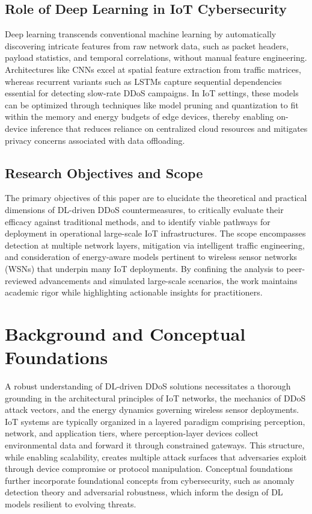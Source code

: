 \documentclass[12pt]{article}
\begin{document}
\subsection{Role of Deep Learning in IoT Cybersecurity}

Deep learning transcends conventional machine learning by automatically discovering intricate features from raw network data, such as packet headers, payload statistics, and temporal correlations, without manual feature engineering. Architectures like CNNs excel at spatial feature extraction from traffic matrices, whereas recurrent variants such as LSTMs capture sequential dependencies essential for detecting slow-rate DDoS campaigns. In IoT settings, these models can be optimized through techniques like model pruning and quantization to fit within the memory and energy budgets of edge devices, thereby enabling on-device inference that reduces reliance on centralized cloud resources and mitigates privacy concerns associated with data offloading.

\subsection{Research Objectives and Scope}

The primary objectives of this paper are to elucidate the theoretical and practical dimensions of DL-driven DDoS countermeasures, to critically evaluate their efficacy against traditional methods, and to identify viable pathways for deployment in operational large-scale IoT infrastructures. The scope encompasses detection at multiple network layers, mitigation via intelligent traffic engineering, and consideration of energy-aware models pertinent to wireless sensor networks (WSNs) that underpin many IoT deployments. By confining the analysis to peer-reviewed advancements and simulated large-scale scenarios, the work maintains academic rigor while highlighting actionable insights for practitioners.

\section{Background and Conceptual Foundations}

A robust understanding of DL-driven DDoS solutions necessitates a thorough grounding in the architectural principles of IoT networks, the mechanics of DDoS attack vectors, and the energy dynamics governing wireless sensor deployments. IoT systems are typically organized in a layered paradigm comprising perception, network, and application tiers, where perception-layer devices collect environmental data and forward it through constrained gateways. This structure, while enabling scalability, creates multiple attack surfaces that adversaries exploit through device compromise or protocol manipulation. Conceptual foundations further incorporate foundational concepts from cybersecurity, such as anomaly detection theory and adversarial robustness, which inform the design of DL models resilient to evolving threats.
\end{document}
